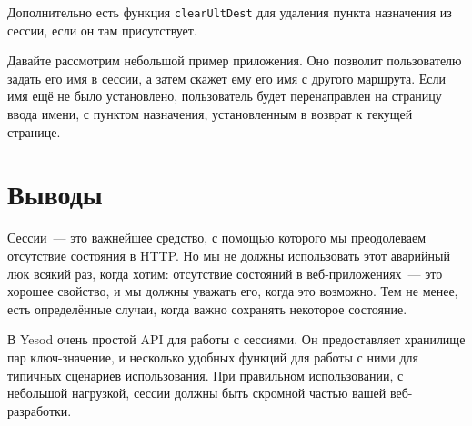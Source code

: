 Дополнительно есть функция \lstinline'clearUltDest' для удаления пункта
назначения из сессии, если он там присутствует.

Давайте рассмотрим небольшой пример приложения. Оно позволит пользователю
задать его имя в сессии, а затем скажет ему его имя с другого маршрута. Если
имя ещё не было установлено, пользователь будет перенаправлен на страницу ввода
имени, с пунктом назначения, установленным в возврат к текущей странице.


\section{Выводы}

Сессии~--- это важнейшее средство, с помощью которого мы преодолеваем
отсутствие состояния в HTTP. Но мы не должны использовать этот аварийный люк
всякий раз, когда хотим: отсутствие состояний в веб-приложениях~--- это хорошее
свойство, и мы должны уважать его, когда это возможно. Тем не менее, есть
определённые случаи, когда важно сохранять некоторое состояние.

В Yesod очень простой API для работы с сессиями. Он предоставляет хранилище пар
ключ-значение, и несколько удобных функций для работы с ними для типичных
сценариев использования. При правильном использовании, с небольшой нагрузкой,
сессии должны быть скромной частью вашей веб-разработки.
